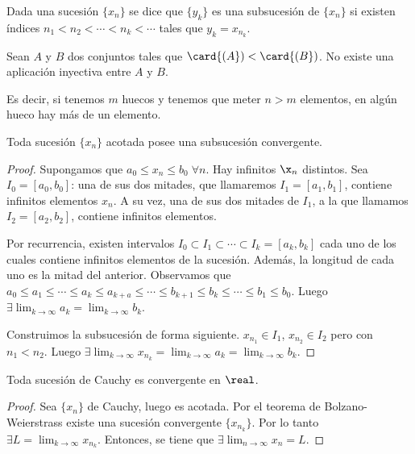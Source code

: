 \documentclass[palatino, nochap]{apuntes}
\begin{document}
\begin{defn}[Subsucesión] Dada una sucesión $\{x_n\}$ se dice que $\{y_k\}$ es una subsucesión de $\{x_n\}$ si existen índices $n_1 < n_2 < \cdots < n_k < \cdots$ tales que $y_k=x_{n_k}$.\end{defn}

\begin{theorem}
Sean $A$ y $B$ dos conjuntos tales que $\card{(A}) < \card{(B})$. No existe una aplicación inyectiva entre $A$ y $B$.

Es decir, si tenemos $m$ huecos y tenemos que meter $n>m$ elementos, en algún hueco hay más de un elemento.
\end{theorem}

\begin{theorem}
Toda sucesión $\{x_n\}$ acotada posee una subsucesión convergente.
\end{theorem}

\begin{proof}
Supongamos que $a_0 ≤ x_n ≤ b_0\; \forall n$. Hay infinitos $\x_n$ distintos. Sea $I_0=[a_0, b_0]$: una de sus dos mitades, que llamaremos $I_1=[a_1,b_1]$, contiene infinitos elementos $x_n$. A su vez, una de sus dos mitades de $I_1$, a la que llamamos $I_2=[a_2, b_2]$, contiene infinitos elementos.

Por recurrencia, existen intervalos $I_0 \subset I_1 \subset \cdots \subset I_k=[a_k, b_k]$ cada uno de los cuales contiene infinitos elementos de la sucesión. Además, la longitud de cada uno es la mitad del anterior. Observamos que $a_0 \leq a_1 \leq \cdots \leq a_k \leq a_{k+a} \leq \cdots \leq b_{k+1} \leq b_k \leq \cdots \leq b_1 \leq b_0$. Luego $\exists \lim_{k\to\infty}a_k =\lim_{k\to\infty}b_k$.

Construimos la subsucesión de forma siguiente. $x_{n_1} \in I_1$, $x_{n_2} \in I_2$ pero con $n_1 < n_2$. Luego $\exists \lim_{k\to\infty} x_{n_k} = \lim_{k\to\infty}a_k =\lim_{k\to\infty}b_k$.
\end{proof}

\begin{corol}Toda sucesión de Cauchy es convergente en $\real$.\end{corol}

\begin{proof}Sea $\{x_n\}$ de Cauchy, luego es acotada. Por el teorema de Bolzano-Weierstrass existe una sucesión convergente $\{x_{n_k}\}$. Por lo tanto $\exists L = \lim_{k\to\infty}x_{n_k}$. Entonces, se tiene que $\exists \lim_{n\to\infty} x_n = L$.\end{proof}
\end{document}

